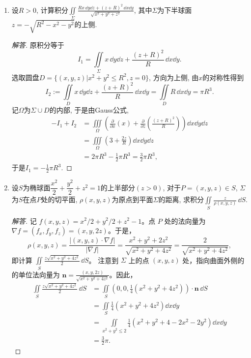 \begin{quiza}
\begin{enumerate}
\item 设\(R>0\), 计算积分\(\iint\limits_{\varSigma}\frac{Rx\,\dd y\dd z+(z+R)^2\,\dd x\dd y}{\sqrt{x^2+y^2+z^2}}\), 
其中\(\varSigma\)为下半球面\(z=-\sqrt{R^2-x^2-y^2}\)的上侧.
\begin{proof}[解答]
原积分等于\[I_1=\iint\limits_{\varSigma}x\,\dd y\dd z+\frac{(z+R)^2}{R}\,\dd x\dd y.\]
选取圆盘\(D=\{(x,y,z)\big|x^2+y^2\leqslant R^2,z=0\}\), 方向为上侧, 由$x$的对称性得到
\[I_2:=\iint\limits_{D}x\,\dd y\dd z+\frac{(z+R)^2}{R}\,\dd x\dd y
=\iint\limits_{D}R\,\dd x\dd y=\pi R^3.\]
记\(\varOmega\)为\(\varSigma\cup D\)的内部, 于是由Gauss公式,
\[\begin{split}
-I_1+I_2&=\iiint\limits_{\varOmega}\left(\frac{\partial}{\partial x}(x)
+\frac{\partial}{\partial z}\left(\frac{(z+R)^2}{R}\right)\right)\dd x\dd y\dd z\\
&=\iiint\limits_{\varOmega}\left(3+\frac{2z}{R}\right)\dd x\dd y\dd z\\
&=2\pi R^3-\frac{1}{2}\pi R^3=\frac{3}{2}\pi R^3,
\end{split}\]
于是\(I_1=-\frac{1}{2}\pi R^3\).
\end{proof}

\item 设\(S\)为椭球面\(\dfrac{x^2}{2}+\dfrac{y^2}{2}+z^2=1\)的上半部分\((z>0)\), 
对于\(P=(x,y,z)\in S\), \(\varSigma\)为\(S\)在点\(P\)处的切平面, 
\(\rho(x,y,z)\)为原点到平面\(\varSigma\)的距离, 
求积分\(\iint\limits_{S}\frac{z}{\rho(x,y,z)}\,\dd S\).
\begin{proof}[解答]
记 $f(x, y, z)=x^2/2+y^2/2+z^2-1$。点 $P$ 处的法向量为 $\nabla f=(f_x, f_y, f_z)=(x,y,2z)$。于是，
\[\rho(x, y, z)=\frac{|(x, y, z) \cdot \nabla f|}{|\nabla f|}
=\frac{x^2+y^2+2z^2}{\sqrt{x^2+y^2+4z^2}}=\frac{2}{\sqrt{x^2+y^2+4z^2}},\]
即计算 \(\iint\limits_S \frac{z \sqrt{x^2+y^2+4z^2}}{2} \, \dd S\)。
注意到 $\varSigma$ 上的点 $(x, y, z)$ 处，指向曲面外侧的的单位法向量为 \(\boldsymbol{n}=\frac{(x, y, 2z)}{\sqrt{x^2+y^2+4z^2}}\)。因此，
\begin{align*}
\iint\limits_S \frac{z \sqrt{x^2+y^2+4z^2}}{2} \, \dd S 
& =\iint\limits_S\left(0,0, \frac{1}{4}\left(x^2+y^2+4z^2\right)\right) \cdot \boldsymbol{n} \, \dd S \\
& =\iint\limits_S \frac{1}{4}\left(x^2+y^2+4z^2\right) \dd x \dd y \\
& =\iint\limits_{x^2+y^2 \leqslant 2} \frac{1}{4}\left(x^2+y^2+4-2x^2-2y^2\right) \dd x \dd y \\
& =\frac{3}{2} \pi.
\end{align*}
\end{proof}


\end{enumerate}
\end{quiza}
